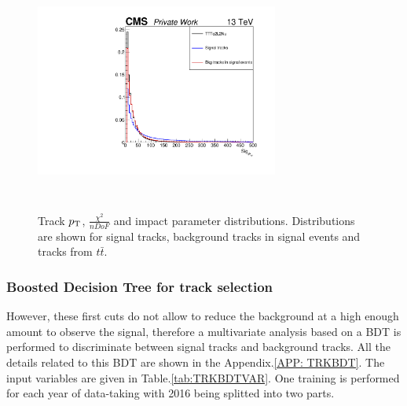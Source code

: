 \documentclass{cernatlasnote}
\newcommand{\pt}{$p_{\text T}$\xspace}
\begin{document}
\begin{figure}[ht]
        \includegraphics[height=8cm, width=8cm, trim= 0cm 0cm 0cm 0cm,clip]{images/TRK/drSig_TT.pdf}
        \caption{\label{fig:TRKDis} Track \pt, $\frac{\chi^2}{nDoF}$ and impact parameter distributions. Distributions are shown for signal tracks, background tracks in signal events and tracks from $t\bar{t}$. }
        \end{figure}

        \FloatBarrier

\subsubsection{Boosted Decision Tree for track selection}
However, these first cuts do not allow to reduce the background at a high enough amount to observe the signal, therefore a multivariate analysis based on a BDT is performed to discriminate between signal tracks and background tracks. All the details related to this BDT are shown in the Appendix.\ref{APP: TRKBDT}. The input variables are given in Table.\ref{tab:TRKBDTVAR}. One training is performed for each year of data-taking with 2016 being splitted into two parts. 
\end{document}
